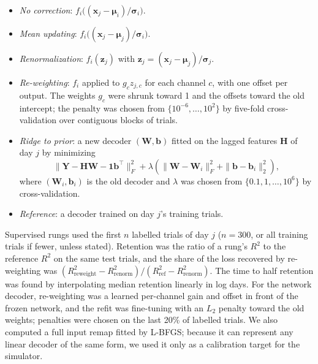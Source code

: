 \documentclass[pdflatex,sn-nature]{sn-jnl}
\begin{document}
\begin{itemize}
\item \textit{No correction}: $f_i\big((\mathbf{x}_j - \boldsymbol{\mu}_i)/\boldsymbol{\sigma}_i\big)$.
\item \textit{Mean updating}: $f_i\big((\mathbf{x}_j - \boldsymbol{\mu}_j)/\boldsymbol{\sigma}_i\big)$.
\item \textit{Renormalization}: $f_i(\mathbf{z}_j)$ with $\mathbf{z}_j = (\mathbf{x}_j - \boldsymbol{\mu}_j)/
\boldsymbol{\sigma}_j$.
\item \textit{Re-weighting}: $f_i$ applied to $g_c z_{j,c}$ for each channel $c$, with one offset per output. The weights
$g_c$ were shrunk toward 1 and the offsets toward the old intercept; the penalty was chosen from
$\{10^{-6}, \ldots, 10^2\}$ by five-fold cross-validation over contiguous blocks of trials.
\item \textit{Ridge to prior}: a new decoder $(\mathbf{W}, \mathbf{b})$ fitted on the lagged features $\mathbf{H}$ of day
$j$ by minimizing
\begin{equation}
\|\mathbf{Y} - \mathbf{H}\mathbf{W} - \mathbf{1}\mathbf{b}^\top\|_F^2 + \lambda\left(\|\mathbf{W} - \mathbf{W}_i\|_F^2
+ \|\mathbf{b} - \mathbf{b}_i\|_2^2\right),
\label{eq:prior}
\end{equation}
where $(\mathbf{W}_i, \mathbf{b}_i)$ is the old decoder and $\lambda$ was chosen from $\{0.1, 1, \ldots, 10^6\}$ by
cross-validation.
\item \textit{Reference}: a decoder trained on day $j$'s training trials.
\end{itemize}

\noindent Supervised rungs used the first $n$ labelled trials of day $j$ ($n = 300$, or all training trials if fewer,
unless stated). Retention was the ratio of a rung's $R^2$ to the reference $R^2$ on the same test trials, and the share
of the loss recovered by re-weighting was $(R^2_{\text{reweight}} - R^2_{\text{renorm}})/(R^2_{\text{ref}} -
R^2_{\text{renorm}})$. The time to half retention was found by interpolating median retention linearly in log days. For
the network decoder, re-weighting was a learned per-channel gain and offset in front of the frozen network, and the
refit was fine-tuning with an $L_2$ penalty toward the old weights; penalties were chosen on the last 20\% of labelled
trials. We also computed a full input remap fitted by L-BFGS\cite{liu1989}; because it can represent any linear decoder
of the same form, we used it only as a calibration target for the simulator.
\end{document}

